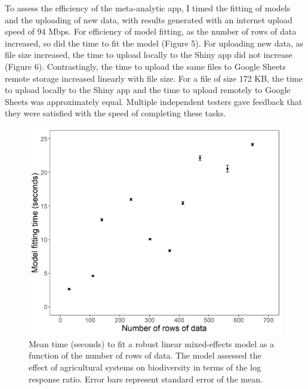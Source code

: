 \documentclass[11pt]{article}
\begin{document}
			\noindent To assess the efficiency of the meta-analytic app, I timed the fitting of models and the uploading of new data, with results generated with an internet upload speed of 94 Mbps. For efficiency of model fitting, as the number of rows of data increased, so did the time to fit the model (Figure 5). For uploading new data, as file size increased, the time to upload locally to the Shiny app did not increase (Figure 6). Contrastingly, the time to upload the same files to Google Sheets remote storage increased linearly with file size. For a file of size 172 KB, the time to upload locally to the Shiny app and the time to upload remotely to Google Sheets was approximately equal. Multiple independent testers gave feedback that they were satisfied with the speed of completing these tasks.  
			
			\begin{figure}[H] 
				\centering 
				\includegraphics[scale=1]{figure_5_model_time_graph.png} 
				\caption{Mean time (seconds) to fit a robust linear mixed-effects model as a function of the number of rows of data. The model assessed the effect of agricultural systems on biodiversity in terms of the log response ratio. Error bars represent standard error of the mean.}  
			\end{figure}
		
\end{document}
